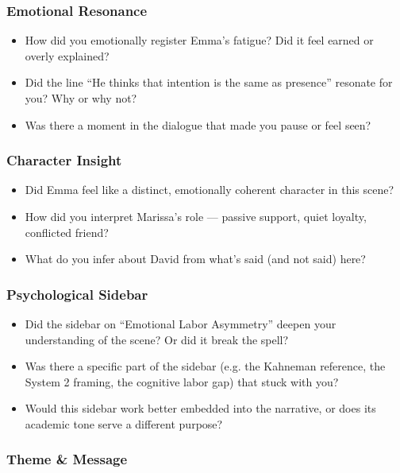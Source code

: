 \subsubsection*{Emotional Resonance}

\begin{itemize}
  \item How did you emotionally register Emma’s fatigue? Did it feel earned or overly explained?
  \item Did the line “He thinks that intention is the same as presence” resonate for you? Why or why not?
  \item Was there a moment in the dialogue that made you pause or feel seen?
\end{itemize}

\subsubsection*{Character Insight}

\begin{itemize}
  \item Did Emma feel like a distinct, emotionally coherent character in this scene?
  \item How did you interpret Marissa’s role — passive support, quiet loyalty, conflicted friend?
  \item What do you infer about David from what’s said (and not said) here?
\end{itemize}

\subsubsection*{Psychological Sidebar}

\begin{itemize}
  \item Did the sidebar on ``Emotional Labor Asymmetry'' deepen your understanding of the scene? Or did it break the spell?
  \item Was there a specific part of the sidebar (e.g. the Kahneman reference, the System 2 framing, the cognitive labor gap) that stuck with you?
  \item Would this sidebar work better embedded into the narrative, or does its academic tone serve a different purpose?
\end{itemize}

\subsubsection*{Theme \& Message}

